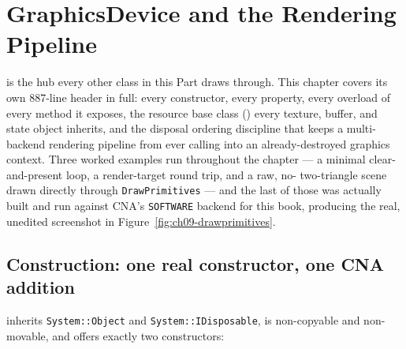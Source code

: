 \chapter{GraphicsDevice and the Rendering Pipeline}
\label{ch:graphicsdevice}

 is the hub every other class in this Part draws through. This
chapter covers its own 887-line header in full: every constructor, every property, every
overload of every method it exposes, the resource base class ()
every texture, buffer, and state object inherits, and the disposal ordering discipline that
keeps a multi-backend rendering pipeline from ever calling into an already-destroyed graphics
context. Three worked examples run throughout the chapter --- a minimal clear-and-present loop,
a render-target round trip, and a raw, no- two-triangle scene drawn
directly through \texttt{DrawPrimitives} --- and the last of those was actually built and run
against CNA's \texttt{SOFTWARE} backend for this book, producing the real, unedited screenshot
in Figure~\ref{fig:ch09-drawprimitives}.

\section{Construction: one real constructor, one CNA addition}

 inherits \texttt{System::Object} and \texttt{System::IDisposable},
is non-copyable and non-movable, and offers exactly two constructors:


